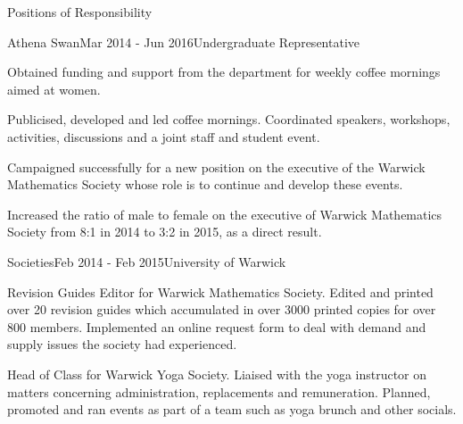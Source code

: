 \documentclass{resume} %
\begin{document}

\begin{rSection}{Positions of Responsibility}


\begin{rSubsection}{Athena Swan}{Mar 2014 - Jun 2016}{Undergraduate Representative}{}
	\item Obtained funding and support from the department for weekly coffee mornings aimed at women. 
	\item Publicised, developed and led coffee mornings. Coordinated speakers, workshops, activities, discussions and a joint staff and student event.
	\item Campaigned successfully for a new position on the executive of the Warwick Mathematics Society whose role is to continue and develop these events. 
	\item Increased the ratio of male to female on the executive of Warwick Mathematics Society from 8:1 in 2014 to 3:2 in 2015, as a direct result.
\end{rSubsection}


\begin{rSubsection}{Societies}{Feb 2014 - Feb 2015}{University of Warwick}{}
\item Revision Guides Editor for Warwick Mathematics Society. Edited and printed over 20 revision guides which accumulated in over 3000 printed copies for over 800 members. Implemented an online request form to deal with demand and supply issues the society had experienced.
\item Head of Class for Warwick Yoga Society. Liaised with the yoga instructor on matters concerning administration, replacements and remuneration. Planned, promoted and ran events as part of a team such as yoga brunch and other socials.
\end{rSubsection}
\end{rSection}
\end{document}
